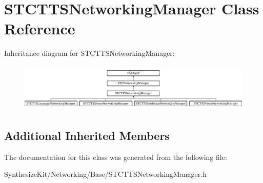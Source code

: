 \hypertarget{interface_s_t_c_t_t_s_networking_manager}{}\section{S\+T\+C\+T\+T\+S\+Networking\+Manager Class Reference}
\label{interface_s_t_c_t_t_s_networking_manager}
Inheritance diagram for S\+T\+C\+T\+T\+S\+Networking\+Manager\+:\begin{figure}[H]
\begin{center}
\leavevmode
\includegraphics[height=2.323651cm]{interface_s_t_c_t_t_s_networking_manager}
\end{center}
\end{figure}
\subsection*{Additional Inherited Members}


The documentation for this class was generated from the following file\+:\begin{DoxyCompactItemize}
\item 
Synthesize\+Kit/\+Networking/\+Base/S\+T\+C\+T\+T\+S\+Networking\+Manager.\+h\end{DoxyCompactItemize}
